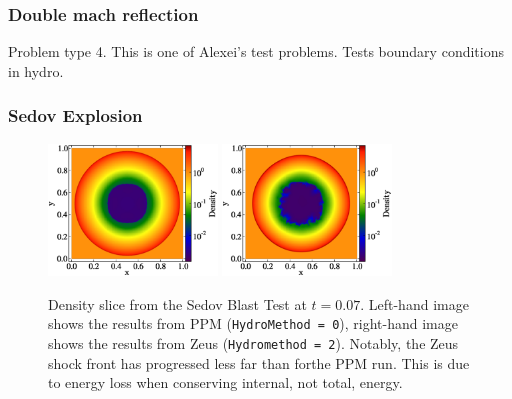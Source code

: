 \subsubsection{Double mach reflection}
\label{sec.tests.doublemach}
Problem type 4.  This is one of Alexei's test problems.  Tests
boundary conditions in hydro.

\subsubsection{Sedov Explosion}
\label{sec.tests.sedov}

\begin{figure}
\begin{center}
\includegraphics[width=0.4\textwidth]{figures/sedov-ppm-slice.eps}
\includegraphics[width=0.4\textwidth]{figures/sedov-zeus-slice.eps}
\caption{Density slice from the Sedov Blast Test at $t = 0.07$. Left-hand image shows the results from PPM ({\tt HydroMethod = 0}), right-hand image shows the results from Zeus ({\tt Hydromethod = 2}). Notably, the Zeus shock front has progressed less far than forthe PPM run. This is due to energy loss when conserving internal, not total, energy.}
\label{fig.sedov1}
\end{center}
\end{figure}


